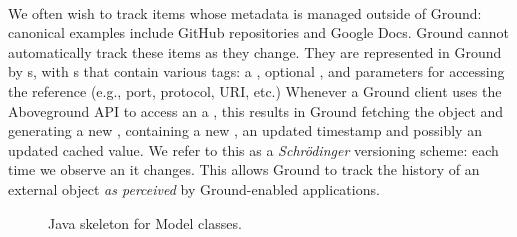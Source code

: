 \documentclass{sig-alternate}
\begin{document}
\\
We often wish to track items whose metadata is managed outside of Ground: canonical examples
include GitHub repositories and Google Docs. Ground cannot automatically track these items as they change.
They are represented in Ground by s, with s that contain various tags: a , optional , and parameters for accessing the
reference (e.g., port, protocol, URI, etc.) 
Whenever a Ground client uses the Aboveground API to access an a , this results in Ground fetching the object and generating a new , containing a new
, an updated timestamp and possibly an updated cached value. We refer to this as a \emph{Schr\"{o}dinger} versioning scheme: each time we observe an  it changes. This allows Ground to track the history of an external object \emph{as perceived} by Ground-enabled applications.

\begin{figure}[bh]
\begin{scriptsize}

\end{scriptsize}
\caption{Java skeleton for Model classes.}
\label{fig:modelcode}
\end{figure}
\end{document}
